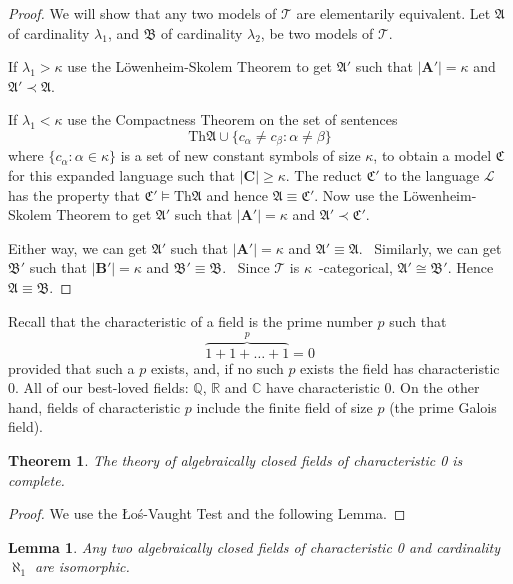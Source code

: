 \documentclass[titlepage, oneside]{amsbook}
\theoremstyle{plain}
\newtheorem{theorem}{Theorem}
\newtheorem{lemma}{Lemma}
\theoremstyle{definition}
\theoremstyle{remark}
\newcommand{\Th}{\ensuremath{\mbox{Th}}}
\newcommand{\lan}{\ensuremath{\mathcal{L}}}
\newcommand{\ma}{\ensuremath{\mathfrak{A}}}
\newcommand{\mc}{\ensuremath{\mathfrak{C}}}
\newcommand{\bc}{\ensuremath{\mathbf{C}}}
\begin{document}
\begin{proof} We will show that any two models of $\mathcal{T}$ are 
elementarily equivalent.
Let $\mathfrak{A}$  of cardinality $\lambda_{1}$, and $\mathfrak{B}$ 
of cardinality $\lambda_{2}$, be two models of $\mathcal{T}$.

If $\lambda_{1} > \kappa $ use the L{\"{o}}wenheim-Skolem Theorem to get $\mathfrak{A}'$ such that $| \mathbf{A}'| = \kappa$ and $\mathfrak{A}' \prec \mathfrak{A}$.

If $\lambda_{1} < \kappa $ use the Compactness Theorem on the set of sentences
\[
   \Th \ma \cup \{ c_{\alpha} \neq c_{\beta} : \alpha \neq \beta \}
\]
where $\{ c_{\alpha} : \alpha \in \kappa \}$ is a set of new constant symbols of size $\kappa$, to obtain a model $ \mc $ for this expanded language such that 
$| \bc | \geq \kappa$. The reduct $\mc '$ to the language $\lan$ has the property that $\mc ' \models \Th \ma $ and hence $ \ma \equiv \mc '$. Now use the L{\"{o}}wenheim-Skolem Theorem to get $\mathfrak{A}'$ such that $| \mathbf{A}'| = \kappa$ and $\mathfrak{A}' \prec \mathfrak{C} '$.

Either way, we can get $\mathfrak{A}'$ such that $|\mathbf{A}'| = \kappa$ 
and $\mathfrak{A}' \equiv \mathfrak{A}$. \       
Similarly, we can get $\mathfrak{B}'$ such that $| \mathbf{B}' | = \kappa 
$ and $\mathfrak{B}' \equiv \mathfrak{B}$. \                   
Since $\mathcal{T}$ is $\kappa$~-categorical, $\mathfrak{A}' \cong 
\mathfrak{B}' $. Hence $\mathfrak{A} \equiv \mathfrak{B}$.
\end{proof}

Recall that the characteristic of a field is the prime number $p$ such
that \[ \overbrace{ 1 + 1 + \dots + 1}^p = 0 \] provided that such a
$p$
exists, and, if no such $p$ exists the field has characteristic 0.  All
of our best-loved fields: $\mathbb{Q}$, $\mathbb{R}$ and $\mathbb{C}$
have characteristic 0.  On the other hand, fields of characteristic
$p$ include the finite field of size $p$ (the prime Galois field).


\begin{theorem}\label{T:acf0}  The theory of algebraically closed 
fields of characteristic 0 is complete.
\end{theorem}

\begin{proof} We use the {\L}o\'{s}-Vaught Test and the following Lemma.
\end{proof}


\begin{lemma}\label{L:closed} Any two algebraically closed fields of
characteristic 0 and cardinality $\aleph_{1}$ are isomorphic.
\end{lemma}
\end{document}
